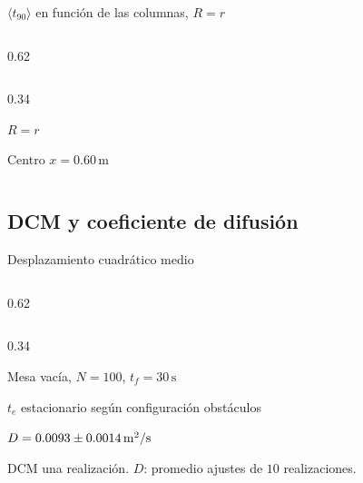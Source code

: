 \documentclass[aspectratio=169,10pt]{beamer}
\begin{document}
\begin{frame}{$\langle t_{90}\rangle$ en función de las columnas, $R = r$}
  \begin{cols}
    \begin{column}{0.62\textwidth}
    \end{column}
    \begin{column}{0.34\textwidth}
      \begin{parametros}
        \item $R = r$
        \item Centro $x = 0.60\,\mathrm{m}$
      \end{parametros}
    \end{column}
  \end{cols}
\end{frame}

\subsection{DCM y coeficiente de difusión}


\begin{frame}{Desplazamiento cuadrático medio}
  \begin{cols}
    \begin{column}{0.62\textwidth}
    \end{column}
    \begin{column}{0.34\textwidth}
      \begin{parametros}
        \item Mesa vacía, $N = 100$, $t_f = 30\,\mathrm{s}$
        \item $t_e$ estacionario según configuración obstáculos
      \end{parametros}
      \begin{resultado}
        \item $D = 0.0093 \pm 0.0014\,\mathrm{m}^{2}/\mathrm{s}$
      \end{resultado}
      {\scriptsize DCM una realización. $D$: promedio ajustes de $10$ realizaciones.}
    \end{column}
  \end{cols}
\end{frame}
\end{document}
